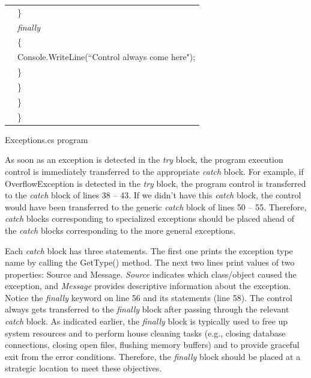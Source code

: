 \begin{program}
\begin{tabular}{ >{\codelinenumfont}c >{\codelistingfont}l}
55 & \hspace{0.6in} \}  \\
56 & \hspace{0.6in} \emph{finally}  \\
57 & \hspace{0.6in} \{  \\
58 & \hspace{0.8in} Console.WriteLine(``Control always come here");  \\
59 & \hspace{0.6in} \}  \\
60 & \hspace{0.4in} \}  \\
61 & \hspace{0.2in} \}  \\
62 & \}  \\

\end{tabular}
\caption{Exceptions.cs program} \label{tab:ExceptionsProg1}
\end{program}
\renewcommand{\baselinestretch}{1.0}



As soon as an exception is detected in the \emph{try} block, the
program execution control is immediately transferred to the
appropriate \emph{catch} block. For example, if OverflowException
is detected in the \emph{try} block, the program control is
transferred to the \emph{catch} block of lines 38 -- 43. If we
didn't have this \emph{catch} block, the control would have been
transferred to the generic \emph{catch} block of lines 50 -- 55.
Therefore, \emph{catch} blocks corresponding to specialized
exceptions should be placed ahead of the \emph{catch} blocks
corresponding to the more general exceptions.

Each \emph{catch} block has three statements. The first one prints
the exception type name by calling the GetType() method. The next
two lines print values of two properties: Source and Message.
\emph{Source} indicates which class/object caused the exception,
and \emph{Message} provides descriptive information about the
exception. Notice the  \emph{finally} keyword on line 56 and its
statements (line 58). The control always gets transferred to the
\emph{finally} block after passing through the relevant
\emph{catch} block. As indicated earlier, the \emph{finally} block
is typically used to free up system resources and to perform house
cleaning tasks (e.g., closing database connections, closing open
files, flushing memory buffers) and to provide graceful exit from
the error conditions. Therefore, the \emph{finally} block should
be placed at a strategic location to meet these objectives.

